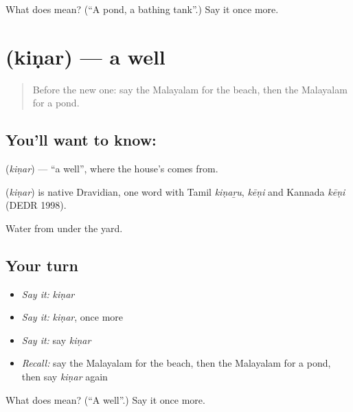 \begin{tcolorbox}[breakable,colback=teal!4,colframe=teal!35!black,title={Before you move on}]
What does  mean? (\textquotedblleft{}A pond, a bathing tank\textquotedblright{}.) Say it once more.
\end{tcolorbox}
\section[\texorpdfstring{\ml{കിണർ} (kiṇar)}{കിണർ (kiṇar)}]{ (kiṇar) — a well}

\label{lesson:ML-C136-well}



\begin{quote}
Before the new one: say the Malayalam for the beach, then the Malayalam for a pond.
\end{quote}

\subsection*{You'll want to know: }
\textbf{} (\emph{kiṇar}) — \textquotedblleft{}a well\textquotedblright{}, where the house's \textbf{} comes from.

\begin{cousinweb}
\textbf{} (\emph{kiṇar}) is native Dravidian, one word with Tamil \emph{kiṇaṟu}, \emph{kēṇi} and Kannada \emph{kēṇi} (DEDR 1998).
\end{cousinweb}

\begin{grammarlens}[title={What you've built}]
Water from under the yard.
\end{grammarlens}

\subsection*{Your turn}
\begin{itemize}
\raggedright
  \item \emph{Say it:} \emph{kiṇar}
  \item \emph{Say it:} \emph{kiṇar}, once more
  \item \emph{Say it:} say \emph{kiṇar}
  \item \emph{Recall:} say the Malayalam for the beach, then the Malayalam for a pond, then say \emph{kiṇar} again
\end{itemize}

\begin{tcolorbox}[breakable,colback=teal!4,colframe=teal!35!black,title={Before you move on}]
What does  mean? (\textquotedblleft{}A well\textquotedblright{}.) Say it once more.
\end{tcolorbox}
